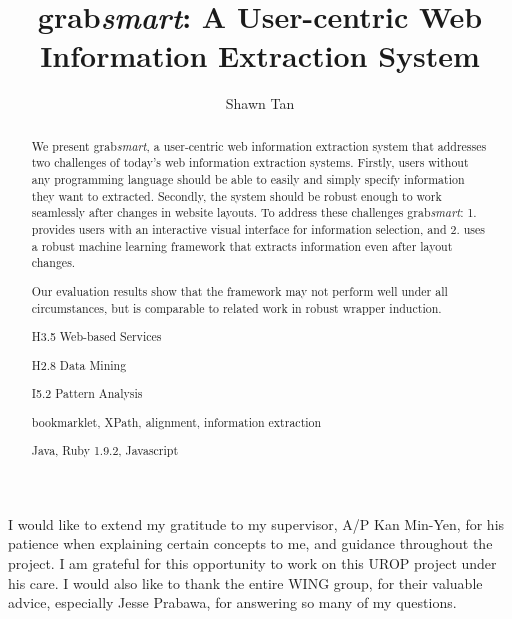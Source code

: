 \documentclass[urop]{socreport}
\begin{document}
\title{grab\textit{smart}: A User-centric Web Information Extraction System}
\author{Shawn Tan}
\maketitle
\begin{abstract}
We present grab\textit{smart}, a user-centric web information extraction system that
addresses two challenges of today's web information extraction systems. Firstly, users
without any programming language should be able to easily and simply specify information
they want to extracted. Secondly, the system should be robust enough to work seamlessly
after changes in website layouts. To address these challenges grab\textit{smart}: 1.
provides users with an interactive visual interface for information selection, and 2.
uses a robust machine learning framework that extracts information even after layout changes.

Our evaluation results show that the framework may not perform well under all circumstances,
but is comparable to related work in robust wrapper induction.

\begin{descriptors}
	\item H3.5 Web-based Services
    \item H2.8 Data Mining
	\item I5.2 Pattern Analysis
\end{descriptors}
\begin{keywords}
	bookmarklet,  XPath, alignment, information extraction
\end{keywords}
\begin{implement}
	Java, Ruby 1.9.2, Javascript
\end{implement}
\end{abstract}

\begin{acknowledgement}
	I would like to extend my gratitude to my supervisor, A/P Kan Min-Yen, for his patience
when explaining certain concepts to me, and guidance throughout the project. I am grateful
for this opportunity to work on this UROP project under his care. I would also like to thank
the entire WING group, for their valuable advice, especially Jesse Prabawa, for answering 
so many of my questions. 
\end{acknowledgement}
\end{document}

